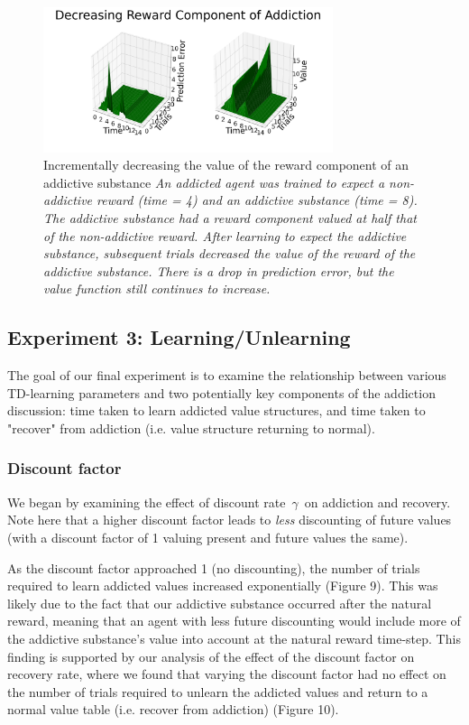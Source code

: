 \documentclass[10pt,letterpaper]{article}
\begin{document}
\begin{figure}[H]
   \centering
    \includegraphics[width = 85mm]{graphs/cost_exp.png}
    \caption{Incrementally decreasing the value of the reward component of an addictive substance
    \newline \emph{An addicted agent was trained to expect a non-addictive reward (time = 4) and an addictive substance (time = 8). The addictive substance had a reward component valued at half that of the non-addictive reward. After learning to expect the addictive substance, subsequent trials decreased the value of the reward of the addictive substance. There is a drop in prediction error, but the value function still continues to increase.}}
    \label{fig:Baseline}
\end{figure}


\subsection{Experiment 3: Learning/Unlearning}
The goal of our final experiment is to examine the relationship between various TD-learning parameters and two potentially key components of the addiction discussion: time taken to learn addicted value structures, and time taken to "recover" from addiction (i.e. value structure returning to normal).

\subsubsection{Discount factor} We began by examining the effect of discount rate $\,\gamma\,$ on addiction and recovery. Note here that a higher discount factor leads to \textit{less} discounting of future values (with a discount factor of 1 valuing present and future values the same).

As the discount factor approached 1 (no discounting), the number of trials required to learn addicted values increased exponentially (Figure 9). This was likely due to the fact that our addictive substance occurred after the natural reward, meaning that an agent with less future discounting would include more of the addictive substance's value into account at the natural reward time-step. This finding is supported by our analysis of the effect of the discount factor on recovery rate, where we found that varying the discount factor had no effect on the number of trials required to unlearn the addicted values and return to a normal value table (i.e. recover from addiction) (Figure 10).
\end{document}
